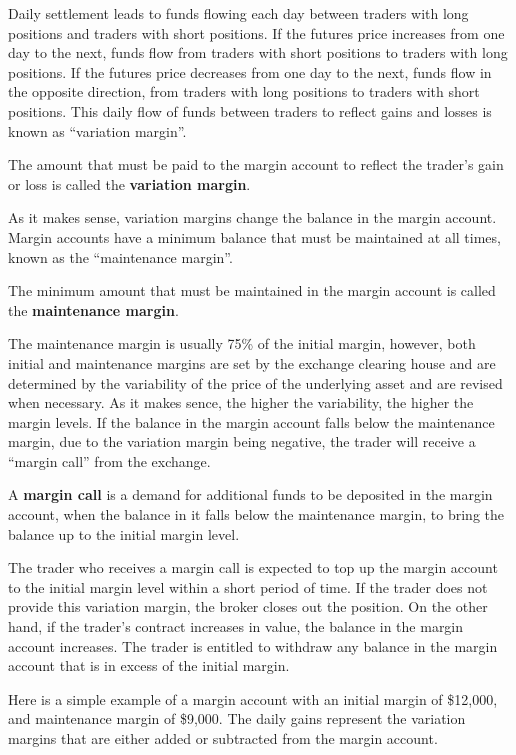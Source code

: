Daily settlement leads to funds flowing each day between traders with long positions and traders with short positions.
If the futures price increases from one day to the next, funds flow from traders with short positions to traders with
long positions. If the futures price decreases from one day to the next, funds flow in the opposite direction, from
traders with long positions to traders with short positions. This daily flow of funds between traders to reflect gains
and losses is known as ``variation margin''.

The amount that must be paid to the margin account to reflect the trader's gain or loss is called the \textbf{variation
margin}.
\ed

As it makes sense, variation margins change the balance in the margin account. Margin accounts have a minimum balance
that must be maintained at all times, known as the ``maintenance margin''.

The minimum amount that must be maintained in the margin account is called the \textbf{maintenance margin}.
\ed

The maintenance margin is usually 75\% of the initial margin, however, both initial and maintenance margins are set
by the exchange clearing house and are determined by the variability of the price of the underlying asset and are
revised when necessary. As it makes sence, the higher the variability, the higher the margin levels. If the balance
in the margin account falls below the maintenance margin, due to the variation margin being negative, the trader
will receive a ``margin call'' from the exchange.

A \textbf{margin call} is a demand for additional funds to be deposited in the margin account, when the balance in it
falls below the maintenance margin, to bring the balance up to the initial margin level.
\ed

The trader who receives a margin call is expected to top up the margin account to the initial margin level within a
short period of time. If the trader does not provide this variation margin, the broker closes out the position. On
the other hand, if the trader's contract increases in value, the balance in the margin account increases. The trader
is entitled to withdraw any balance in the margin account that is in excess of the initial margin.

\be
Here is a simple example of a margin account with an initial margin of \$12,000, and maintenance margin of \$9,000.
The daily gains represent the variation margins that are either added or subtracted from the margin account.
\ee

